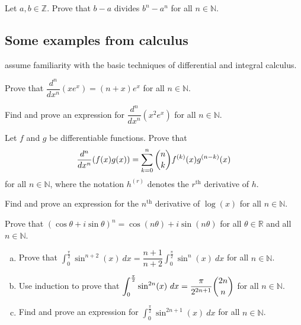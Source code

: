 \begin{chapex}
Let $a,b \in \mathbb{Z}$. Prove that $b-a$ divides $b^n-a^n$ for all $n \in \mathbb{N}$.
\end{chapex}

\subsection*{Some examples from calculus}

 assume familiarity with the basic techniques of differential and integral calculus.

\begin{chapex}
\label{cqCalculusBegin}
Prove that $\dfrac{d^n}{dx^n}(xe^x) = (n+x)e^x$ for all $n \in \mathbb{N}$.
\end{chapex}

\begin{chapex}
Find and prove an expression for $\dfrac{d^n}{dx^n}(x^2e^x)$ for all $n \in \mathbb{N}$.
\end{chapex}

\begin{chapex}
Let $f$ and $g$ be differentiable functions. Prove that
\[ \dfrac{d^n}{dx^n}(f(x)g(x)) = \sum_{k=0}^n \dbinom{n}{k} f^{(k)}(x) g^{(n-k)}(x) \]
for all $n \in \mathbb{N}$, where the notation $h^{(r)}$ denotes the $r^{\text{th}}$ derivative of $h$.
\end{chapex}

\begin{chapex}
Find and prove an expression for the $n^{\text{th}}$ derivative of $\log(x)$ for all $n \in \mathbb{N}$.
\end{chapex}

\begin{chapex}
Prove that $(\cos \theta + i \sin \theta)^n = \cos (n\theta) + i \sin (n\theta)$ for all $\theta \in \mathbb{R}$ and all $n \in \mathbb{N}$.
\end{chapex}

\begin{chapex}
\label{cqCalculusEnd}
\begin{enumerate}[(a)]
\item Prove that $\displaystyle \int_0^{\frac{\pi}{2}} \sin^{n+2}(x)~dx = \dfrac{n+1}{n+2} \int_0^{\frac{\pi}{2}} \sin^n(x)~dx$ for all $n \in \mathbb{N}$.
\item Use induction to prove that $\displaystyle \int_0^{\frac{\pi}{2}} \sin^{2n}(x)~dx = \dfrac{\pi}{2^{2n+1}} \dbinom{2n}{n}$ for all $n \in \mathbb{N}$.
\item Find and prove an expression for $\displaystyle \int_0^{\frac{\pi}{2}} \sin^{2n+1}(x)~dx$ for all $n \in \mathbb{N}$.
\end{enumerate}
\end{chapex}

